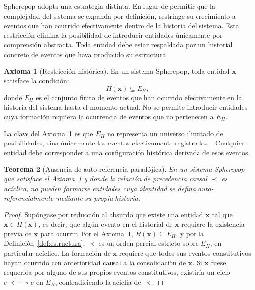 \documentclass[12pt]{article}
\theoremstyle{plain}
\newtheorem{theorem}{Teorema}[section]
\theoremstyle{definition}
\newtheorem{axiom}[theorem]{Axioma}
\begin{document}
Spherepop adopta una estrategia distinta. En lugar de permitir que la complejidad del sistema se expanda por definición, restringe su crecimiento a eventos que han ocurrido efectivamente dentro de la historia del sistema. Esta restricción elimina la posibilidad de introducir entidades únicamente por comprensión abstracta. Toda entidad debe estar respaldada por un historial concreto de eventos que haya producido su estructura.

\begin{axiom}[Restricción histórica]
\label{ax:restriccion}
En un sistema Spherepop, toda entidad $\mathbf{x}$ satisface la condición:
\[
H(\mathbf{x}) \subseteq E_H,
\]
donde $E_H$ es el conjunto finito de eventos que han ocurrido efectivamente en la historia del sistema hasta el momento actual. No se permite introducir entidades cuya formación requiera la ocurrencia de eventos que no pertenecen a $E_H$.
\end{axiom}

La clave del Axioma~\ref{ax:restriccion} es que $E_H$ no representa un universo ilimitado de posibilidades, sino únicamente los eventos efectivamente registrados~\cite{fowler}. Cualquier entidad debe corresponder a una configuración histórica derivada de esos eventos.

\begin{theorem}[Ausencia de auto-referencia paradójica]
\label{thm:noparadoja}
En un sistema Spherepop que satisface el Axioma~\ref{ax:restriccion} y donde la relación de precedencia causal $\prec$ es acíclica, no pueden formarse entidades cuya identidad se defina auto-referencialmente mediante su propia historia.
\end{theorem}

\begin{proof}
Supóngase por reducción al absurdo que existe una entidad $\mathbf{x}$ tal que $\mathbf{x} \in H(\mathbf{x})$, es decir, que algún evento en el historial de $\mathbf{x}$ requiere la existencia previa de $\mathbf{x}$ para ocurrir. Por el Axioma~\ref{ax:restriccion}, $H(\mathbf{x}) \subseteq E_H$, y por la Definición~\ref{def:estructura}, $\prec$ es un orden parcial estricto sobre $E_H$, en particular acíclico. La formación de $\mathbf{x}$ requiere que todos sus eventos constitutivos hayan ocurrido con anterioridad causal a la consolidación de $\mathbf{x}$. Si $\mathbf{x}$ fuese requerida por alguno de sus propios eventos constitutivos, existiría un ciclo $e \prec \cdots \prec e$ en $E_H$, contradiciendo la aciclia de $\prec$.
\end{proof}
\end{document}
